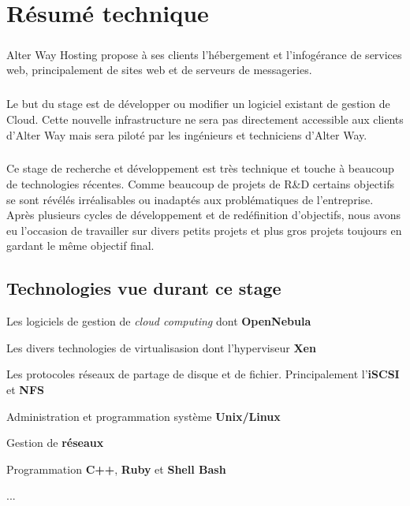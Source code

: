 \chapter*{Résumé technique}
\paragraph*{}
	Alter Way Hosting propose à ses clients l'hébergement et l'infogérance de
	services web, principalement de sites web et de serveurs de messageries.

\paragraph*{}
	Le but du stage est de développer ou modifier un logiciel existant de gestion
	de Cloud. Cette nouvelle infrastructure ne sera pas directement accessible
	aux clients d'Alter Way mais sera piloté par les ingénieurs et techniciens
	d'Alter Way.

\paragraph*{}
	Ce stage de recherche et développement est très technique et touche à beaucoup de technologies récentes.
	Comme beaucoup de projets de R\&D certains objectifs se sont révélés irréalisables ou inadaptés aux problématiques
	de l'entreprise.\\
	Après plusieurs cycles de développement et de redéfinition d'objectifs, nous avons eu l'occasion de travailler
	sur divers petits projets et plus gros projets toujours en gardant le même objectif final.

\section*{Technologies vue durant ce stage}
\begin{listi}
	\item Les logiciels de gestion de \emph{cloud computing} dont \textbf{OpenNebula}\\
	\item Les divers technologies de virtualisasion dont l'hyperviseur \textbf{Xen}\\
	\item Les protocoles réseaux de partage de disque et de fichier. Principalement l'\textbf{iSCSI} et \textbf{NFS}\\
	\item Administration et programmation système \textbf{Unix/Linux}\\
	\item Gestion de \textbf{réseaux}\\
	\item Programmation \textbf{C++}, \textbf{Ruby} et \textbf{Shell Bash}\\
	\item ...
\end{listi}